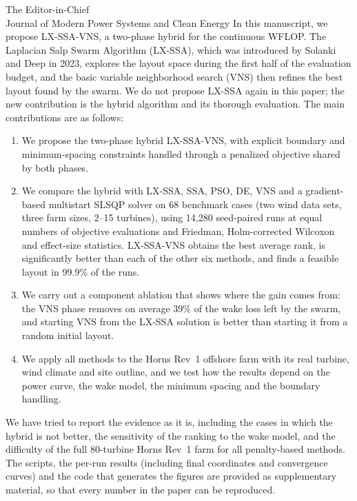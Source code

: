 \documentclass[11pt]{letter}
\begin{document}
\begin{letter}{The Editor-in-Chief\\Journal of Modern Power Systems and Clean Energy}
In this manuscript, we propose LX-SSA-VNS, a two-phase hybrid for the continuous WFLOP. The Laplacian Salp Swarm Algorithm (LX-SSA), which was introduced by Solanki and Deep in 2023, explores the layout space during the first half of the evaluation budget, and the basic variable neighborhood search (VNS) then refines the best layout found by the swarm. We do not propose LX-SSA again in this paper; the new contribution is the hybrid algorithm and its thorough evaluation. The main contributions are as follows:
\begin{enumerate}
\item We propose the two-phase hybrid LX-SSA-VNS, with explicit boundary and minimum-spacing constraints handled through a penalized objective shared by both phases.
\item We compare the hybrid with LX-SSA, SSA, PSO, DE, VNS and a gradient-based multistart SLSQP solver on 68 benchmark cases (two wind data sets, three farm sizes, 2--15 turbines), using 14,280 seed-paired runs at equal numbers of objective evaluations and Friedman, Holm-corrected Wilcoxon and effect-size statistics. LX-SSA-VNS obtains the best average rank, is significantly better than each of the other six methods, and finds a feasible layout in 99.9\% of the runs.
\item We carry out a component ablation that shows where the gain comes from: the VNS phase removes on average 39\% of the wake loss left by the swarm, and starting VNS from the LX-SSA solution is better than starting it from a random initial layout.
\item We apply all methods to the Horns Rev~1 offshore farm with its real turbine, wind climate and site outline, and we test how the results depend on the power curve, the wake model, the minimum spacing and the boundary handling.
\end{enumerate}
We have tried to report the evidence as it is, including the cases in which the hybrid is not better, the sensitivity of the ranking to the wake model, and the difficulty of the full 80-turbine Horns Rev~1 farm for all penalty-based methods. The scripts, the per-run results (including final coordinates and convergence curves) and the code that generates the figures are provided as supplementary material, so that every number in the paper can be reproduced.



\end{letter}
\end{document}
